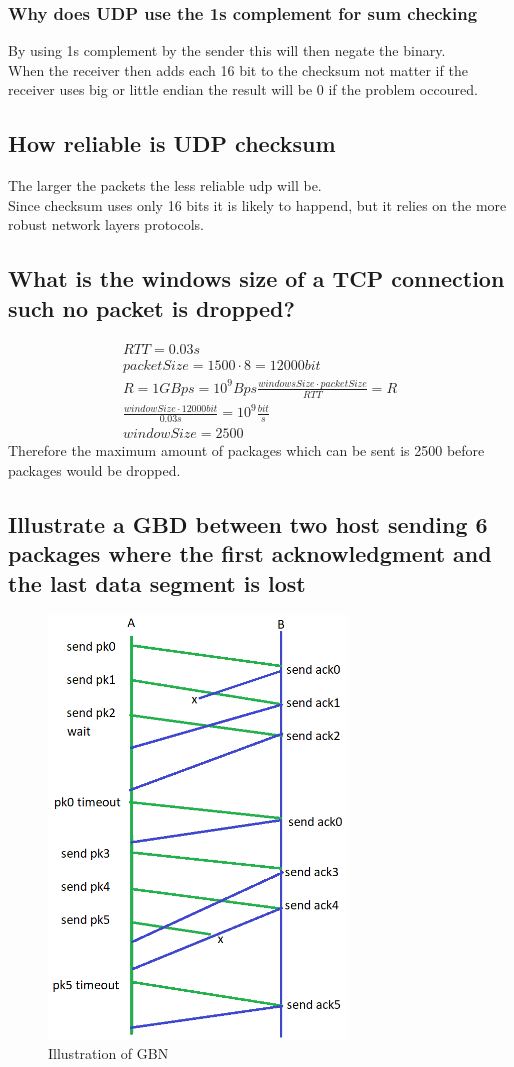 \documentclass[12pt, a4paper]{article}
\begin{document}
			\subsubsection{Why does UDP use the 1s complement for sum checking}
				By using 1s complement by the sender this will then negate the binary.\\
				When the receiver then adds each 16 bit to the checksum not matter if the receiver uses big or little endian the result will be 0 if the problem occoured.
		\subsection{How reliable is UDP checksum}
			The larger the packets the less reliable udp will be.\\
			Since checksum uses only 16 bits it is likely to happend, but it relies on the more robust network layers protocols.
		\subsection{What is the windows size of a TCP connection such no packet is dropped?}
			\begin{align*}
				RTT=0.03s\\
				packetSize=1500\cdot 8=12000bit\\
				R=1GBps=10^9Bps
				\frac{windowsSize\cdot packetSize}{RTT}=R\\
				\frac{windowSize\cdot 12000bit}{0.03s}=10^9\frac{bit}{s}\\
				windowSize = 2500
			\end{align*}
			Therefore the maximum amount of packages which can be sent is 2500 before packages would be dropped.
		\subsection{Illustrate a GBD between two host sending 6 packages where the first acknowledgment and the last data segment is lost}
			\begin{figure}[h!]
				\includegraphics[width=300px]{assets/GBN.png}
				\caption{Illustration of GBN}
			\end{figure}
\end{document}
